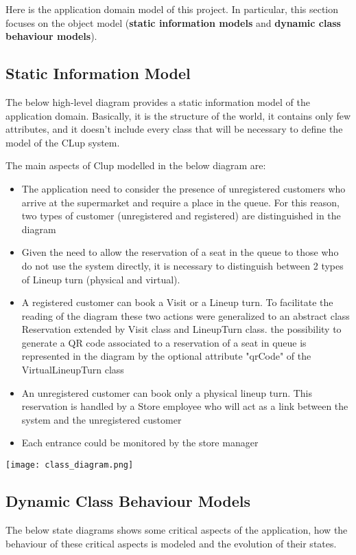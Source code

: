 Here is the application domain model of this project. In particular, this section focuses on the object model (\textbf{static information models} and \textbf{dynamic class behaviour models}).
\subsection{Static Information Model}
The below high-level diagram provides a static information model of the application domain. Basically, it is the structure of the world, it contains only few attributes, and it doesn't include every class that will be necessary to define the model of the CLup system.

The main aspects of Clup modelled in the below diagram are:
\begin{itemize}
    \item The application need to consider the presence of unregistered customers who arrive at the supermarket and require a place in the queue. For this reason, two types of customer (unregistered and registered) are distinguished in the diagram
    \item Given the need to allow the reservation of a seat in the queue to those who do not use the system directly, it is necessary to distinguish between 2 types of Lineup turn (physical and virtual).
    \item A registered customer can book a Visit or a Lineup turn. To facilitate the reading of the diagram these two actions were generalized to an abstract class Reservation extended by Visit class and LineupTurn class. the possibility to generate a QR code associated to a reservation of a seat in queue is represented in the diagram by the optional attribute "qrCode" of the VirtualLineupTurn class
    \item An unregistered customer can book only a physical lineup turn. This reservation is handled by a Store employee who will act as a link between the system and the unregistered customer
    \item Each entrance could be monitored by the store manager
\end{itemize}
\texttt{[image: class\_diagram.png]}


\subsection{Dynamic Class Behaviour Models}
The below state diagrams shows some	critical aspects of	the	application, how the behaviour of these critical aspects is modeled and the evolution of their states.

